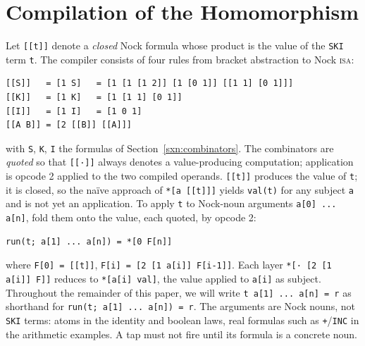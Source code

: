 \documentclass[twoside]{article}
\begin{document}
\section{Compilation of the Homomorphism}

Let \lstinline[style=inlinecode]{[[t]]} denote a \emph{closed} Nock formula whose product is the value of the \texttt{SKI}
term \lstinline[style=inlinecode]{t}. The compiler consists of four rules from bracket abstraction to Nock \textsc{isa}:

\begin{lstlisting}[style=listingblock]
[[S]]   = [1 S]   = [1 [1 [1 2]] [1 [0 1]] [[1 1] [0 1]]]
[[K]]   = [1 K]   = [1 [1 1] [0 1]]
[[I]]   = [1 I]   = [1 0 1]
[[A B]] = [2 [[B]] [[A]]]
\end{lstlisting}

\noindent
with \lstinline[style=inlinecode]{S}, \lstinline[style=inlinecode]{K}, \lstinline[style=inlinecode]{I} the formulas of Section~\ref{sxn:combinators}.  The combinators are \emph{quoted} so that
\lstinline[style=inlinecode]{[[·]]} always denotes a value-producing computation; application is opcode 2 applied to the two compiled operands.  \lstinline[style=inlinecode]{[[t]]} produces the value of \lstinline[style=inlinecode]{t}; it is closed, so the na\"{i}ve approach of \lstinline[style=inlinecode]{*[a [[t]]]} yields \lstinline[style=inlinecode]{val(t)} for any subject \lstinline[style=inlinecode]{a} and is not yet an application.  To apply \lstinline[style=inlinecode]{t} to Nock-noun arguments \lstinline[style=inlinecode]{a[0] ... a[n]}, fold them onto the value, each quoted, by opcode 2:

\begin{lstlisting}[style=listingblock]
run(t; a[1] ... a[n]) = *[0 F[n]]
\end{lstlisting}

\noindent
where \lstinline[style=inlinecode]{F[0] = [[t]]},  \lstinline[style=inlinecode]{F[i] = [2 [1 a[i]] F[i-1]]}.  Each layer \lstinline[style=inlinecode]{*[· [2 [1 a[i]] F]]} reduces to \lstinline[style=inlinecode]{*[a[i] val]}, the value applied to \lstinline[style=inlinecode]{a[i]} as subject.  Throughout the remainder of this paper, we will write \lstinline[style=inlinecode]{t a[1] ... a[n] = r} as shorthand for \lstinline[style=inlinecode]{run(t; a[1] ... a[n]) = r}.  The arguments are Nock nouns, not \texttt{SKI} terms:  atoms in the identity and boolean laws, real formulas such as \texttt{+}/\texttt{INC} in the arithmetic examples.  A tap must not fire until its formula is a concrete noun.
\end{document}
